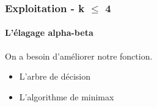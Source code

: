 \documentclass{beamer}
\begin{document}
\begin{frame}[t]
    \frametitle{Exploitation - k $\le$ 4}
    \framesubtitle{L'élagage alpha-beta}
    On a besoin d'améliorer notre fonction.    
    \cleargoban
        \begin{itemize}
            \item<2-> L'arbre de décision
            \item<3-> L'algorithme de minimax
        \end{itemize}


\end{frame}
\end{document}
